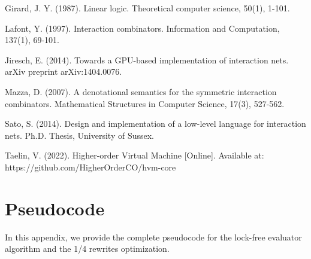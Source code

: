 \documentclass{article}
\begin{document}
\begin{thebibliography}{9}
Girard, J. Y. (1987). Linear logic. Theoretical computer science, 50(1), 1-101.

Lafont, Y. (1997). Interaction combinators. Information and Computation, 137(1), 69-101.

Jiresch, E. (2014). Towards a GPU-based implementation of interaction nets. arXiv preprint arXiv:1404.0076.

Mazza, D. (2007). A denotational semantics for the symmetric interaction combinators. Mathematical Structures in Computer Science, 17(3), 527-562.

Sato, S. (2014). Design and implementation of a low-level language for interaction nets. Ph.D. Thesis, University of Sussex.

Taelin, V. (2022). Higher-order Virtual Machine [Online]. Available at: https://github.com/HigherOrderCO/hvm-core
\end{thebibliography}

\appendix
\section{Pseudocode}\label{app:pseudocode}

In this appendix, we provide the complete pseudocode for the lock-free evaluator algorithm and the 1/4 rewrites optimization.
\end{document}
